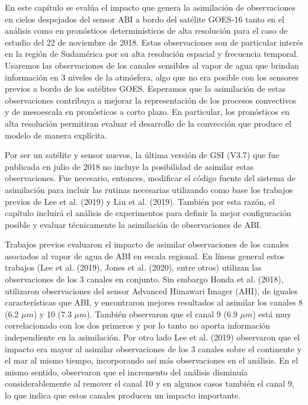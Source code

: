 \documentclass[12pt,oneside,a4paper]{reedthesis}
\begin{document}
En este capítulo se evalúa el impacto que genera la asimilación de observaciones en cielos despejados del sensor ABI a bordo del satélite GOES-16 tanto en el análisis como en pronósticos determinísticos de alta resolución para el caso de estudio del 22 de noviembre de 2018. Estas observaciones son de particular interés en la región de Sudamérica por su alta resolución espacial y frecuencia temporal. Usaremos las observaciones de los canales sensibles al vapor de agua que brindan información en 3 niveles de la atmósfera, algo que no era posible con los sensores previos a bordo de los satélites GOES. Esperamos que la asimilación de estas observaciones contribuya a mejorar la representación de los procesos convectivos y de mesoescala en pronósticos a corto plazo. En particular, los pronósticos en alta resolución permitiran evaluar el desarrollo de la convección que produce el modelo de manera explícita.

Por ser un satélite y sensor nuevos, la última versión de GSI (V3.7) que fue publicada en julio de 2018 no incluye la posibilidad de asimilar estas observaciones. Fue necesario, entonces, modificar el código fuente del sistema de asimilación para incluir las rutinas necesarias utilizando como base los trabajos previos de Lee et al. (2019) y Liu et al. (2019). También por esta razón, el capítulo incluirá el análisis de experimentos para definir la mejor configuración posible y evaluar técnicamente la asimilación de observaciones de ABI.

Trabajos previos evaluaron el impacto de asimilar observaciones de los canales asociados al vapor de agua de ABI en escala regional. En líneas general estos trabajos (Lee et al. (2019), Jones et al. (2020), entre otros) utilizan las observaciones de los 3 canales en conjunto. Sin embargo Honda et al. (2018), utilizaron observaciones del sensor Advanced Himawari Imager (AHI), de iguales características que ABI, y encontraron mejores resultados al asimilar los canales 8 (6.2 \(\mu m\)) y 10 (7.3 \(\mu m\)). También observaron que el canal 9 (6.9 \(\mu m\)) está muy correlacionado con los dos primeros y por lo tanto no aporta información independiente en la asimilación. Por otro lado Lee et al. (2019) observaron que el impacto era mayor al asimilar observaciones de los 3 canales sobre el continente y el mar al mismo tiempo, incorporando así más observaciones en el análisis. En el mismo sentido, observaron que el incremento del análisis disminuía considerablemente al remover el canal 10 y en algunos casos también el canal 9, lo que indica que estos canales producen un impacto importante.
\end{document}
